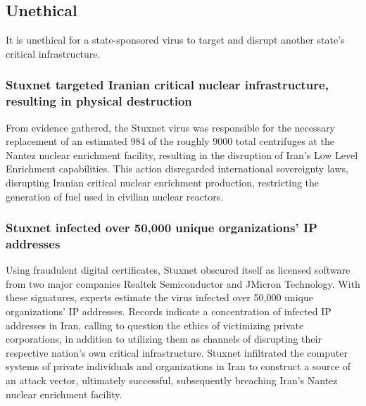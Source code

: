 \documentclass[12pt]{article}
\begin{document}
\begin{multicols}{2}
\subsection{Unethical}

It is unethical for a state-sponsored virus to target and disrupt another state's critical infrastructure.

\subsubsection{Stuxnet targeted Iranian critical nuclear infrastructure, resulting in physical destruction}

From evidence gathered, the Stuxnet virus was responsible for the necessary replacement of an estimated 984 of the roughly 9000 total centrifuges at the Nantez nuclear enrichment facility, resulting in the disruption of Iran's Low Level Enrichment capabilities.\cite{lookIntoIranianNuclearProgram} This action disregarded international sovereignty laws, disrupting Iranian critical nuclear enrichment production, restricting the generation of fuel used in civilian nuclear reactors.\cite{internationalSovereigntyDefinition}\footnotemark[2] 


\subsubsection{Stuxnet infected over 50,000 unique organizations' IP addresses}

Using fraudulent digital certificates, Stuxnet obscured itself as licensed software from two major companies Realtek Semiconductor and JMicron Technology. With these signatures, experts estimate the virus infected over 50,000 unique organizations' IP addresses.\cite{lessonsFromStuxnet} Records indicate a concentration of infected IP addresses in Iran, calling to question the ethics of victimizing private corporations, in addition to  utilizing them as channels of disrupting their respective nation's own critical infrastructure. Stuxnet infiltrated the computer systems of private individuals and organizations in Iran to construct a source of an attack vector, ultimately successful, subsequently breaching Iran's Nantez nuclear enrichment facility.\cite{w32.stuxnetDossier} 


\end{multicols}
\end{document}
